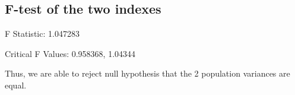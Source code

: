\documentclass[a4paper]{article}
\begin{document}
\subsection{F-test of the two indexes}
\begin{flushleft}
F Statistic: 1.047283

Critical F Values: 0.958368, 1.04344

Thus, we are able to reject null hypothesis that the 2 population variances are equal.
\end{flushleft}


\end{document}
